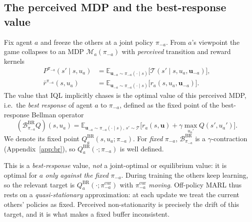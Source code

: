\documentclass[sigconf]{aamas}
\newcommand{\uma}{\mathbf{u}_{-a}}
\newcommand{\picur}{\pi^{\mathrm{cur}}_{-a}}
\newcommand{\Qbr}{Q^{\mathrm{BR}}_{a}}
\newcommand{\Bop}{\mathcal{B}}
\begin{document}
\subsection{The perceived MDP and the best-response value}
Fix agent $a$ and freeze the others at a joint policy $\pi_{-a}$. From $a$'s
viewpoint the game collapses to an MDP $\mathcal{M}_a(\pi_{-a})$ with
\emph{perceived} transition and reward kernels
\begin{align}
P^{\pi_{-a}}(s'\mid s,u_a)&=\mathbb{E}_{\uma\sim\pi_{-a}(\cdot\mid s)}\big[\mathcal{T}(s'\mid s,u_a,\uma)\big],\\
\bar r^{\pi_{-a}}(s,u_a)&=\mathbb{E}_{\uma\sim\pi_{-a}(\cdot\mid s)}\big[r_a(s,u_a,\uma)\big].
\end{align}
The value that IQL implicitly chases is the optimal value of this perceived MDP,
i.e.\ the \emph{best response} of agent $a$ to $\pi_{-a}$, defined as the fixed
point of the best-response Bellman operator
\begin{equation}
\label{eq:br}
(\Bop^{\mathrm{BR}}_{\pi_{-a}}Q)(s,u_a)=
\mathbb{E}_{\uma\sim\pi_{-a}(\cdot\mid s),\,s'\sim\mathcal{T}}
\Big[r_a(s,\mathbf{u})+\gamma\max_{u_a'}Q(s',u_a')\Big].
\end{equation}
We denote its fixed point $\Qbr(s,u_a;\pi_{-a})$. For \emph{fixed} $\pi_{-a}$,
$\Bop^{\mathrm{BR}}_{\pi_{-a}}$ is a $\gamma$-contraction
(Appendix~\ref{app:br}), so $\Qbr(\cdot;\pi_{-a})$ is well defined.

This is a \emph{best-response} value, \emph{not} a joint-optimal or equilibrium
value: it is optimal for $a$ \emph{only against the fixed} $\pi_{-a}$. During
training the others keep learning, so the relevant target is
$\Qbr(\cdot;\picur)$ with $\picur$ \emph{moving}. Off-policy MARL thus rests on a
\emph{quasi-stationary} approximation: at each update we treat the current others'
policies as fixed. Perceived non-stationarity is precisely the drift of this
target, and it is what makes a fixed buffer inconsistent.
\end{document}
